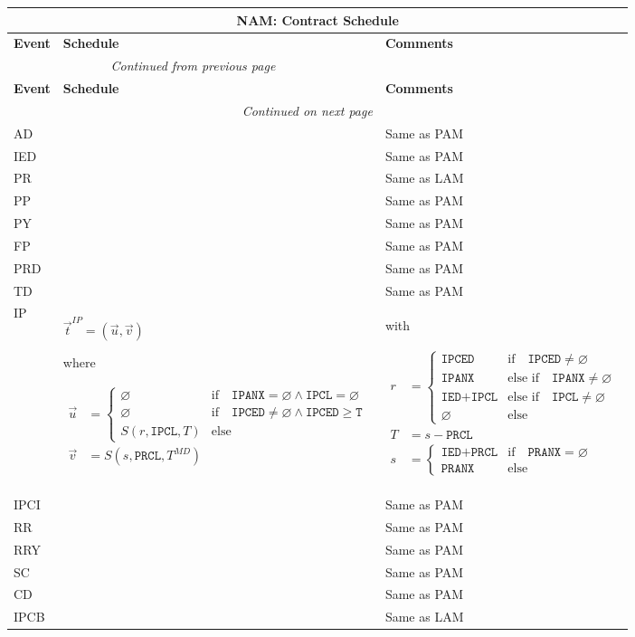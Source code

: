 \documentclass[9pt,oneside]{amsart}
\newenvironment{schedule}[1]{
	\begin{longtable}[H]{| p{0.05\textwidth} | p{0.5\textwidth} |  p{0.4\textwidth} |}
	\multicolumn{3}{c}{\textbf{#1: Contract Schedule}}\\
	\hline
	\textbf{Event} & \textbf{Schedule} & \textbf{Comments} \\
	\hline
	\endfirsthead
	\multicolumn{2}{c}{\textit{Continued from previous page}} \\
	\hline
	\textbf{Event} & \textbf{Schedule} & \textbf{Comments} \\
	\hline
	\endhead
	\hline \multicolumn{2}{r}{\textit{Continued on next page}} \\
	\endfoot
	\hline
	\endlastfoot
}{%
	\hline
	\end{longtable}
}
\newcommand{\attr}[1]{\texttt{#1}}
\newcommand{\sdl}[3]{S(#1,#2,#3)}
\newcommand{\undef}{\varnothing}
\begin{document}
\begin{schedule}{NAM}
	AD & & Same as PAM \\
	\hline
	IED & & Same as PAM \\
	\hline
	PR & & Same as LAM \\
	\hline
	PP & & Same as PAM \\
	\hline
	PY & & Same as PAM \\
	\hline
	FP & & Same as PAM \\
	\hline
	PRD & & Same as PAM \\
	\hline
	TD & & Same as PAM \\
	\hline
	IP & $\vec{t}^{IP} = (\vec{u},\vec{v})$ \par
		where \par
		{$\begin{aligned} \vec{u} &= \begin{cases} \undef & \text{if}\quad \attr{IPANX}=\undef\land\attr{IPCL}=\undef \\
							\undef & \text{if}\quad \attr{IPCED}\neq\undef\land\attr{IPCED}\geq\attr{T}\\
							\sdl{r}{\attr{IPCL}}{T} & \text{else} \end{cases} \\
				\vec{v} &= \sdl{s}{\attr{PRCL}}{T^{MD}} \end{aligned}$}
		 & with\par {$\begin{aligned} r &= \begin{cases} \attr{IPCED} & \text{if}\quad \attr{IPCED}\neq\undef \\
								\attr{IPANX} & \text{else if}\quad \attr{IPANX}\neq\undef \\
								\attr{IED}+\attr{IPCL} & \text{else if}\quad \attr{IPCL}\neq\undef \\
								\undef & \text{else} \end{cases} \\
						T &= s-\attr{PRCL} \\
						s &= \begin{cases} \attr{IED}+\attr{PRCL} & \text{if} \quad \attr{PRANX} = \undef \\
					   \attr{PRANX} & \text{else} \end{cases} \end{aligned}$} \\
	\hline
	IPCI & & Same as PAM \\
	\hline
	RR & & Same as PAM \\
	\hline
	RRY & & Same as PAM \\
  	\hline
	SC & & Same as PAM \\
	\hline
	CD & & Same as PAM \\
  	\hline
	IPCB & & Same as LAM \\
\end{schedule}
\end{document}
